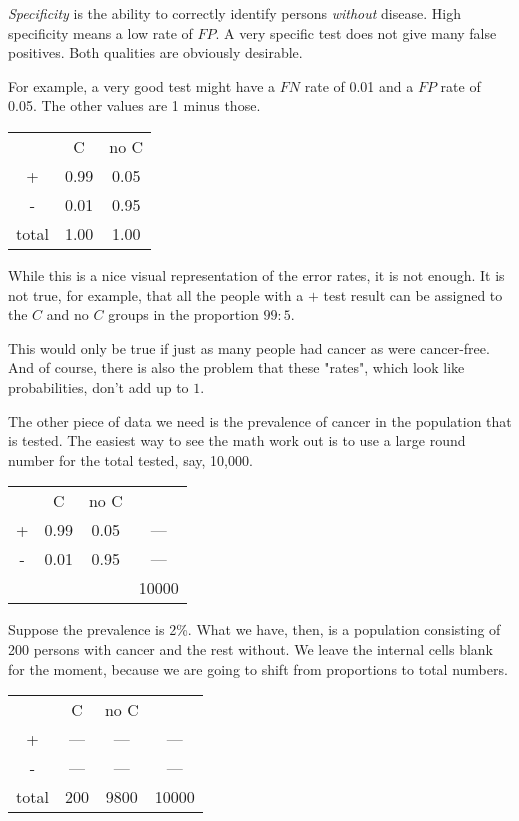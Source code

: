 \documentclass[11pt, oneside]{article}
\begin{document}
\emph{Specificity} is the ability to correctly identify persons \emph{without} disease.  High specificity means a low rate of $FP$.  A very specific test does not give many false positives.  Both qualities are obviously desirable.

For example, a very good test might have a $FN$ rate of 0.01 and a $FP$ rate of 0.05.  The other values are 1 minus those.
\begin{center}
\begin{tabular}{ |c|c|c| } 
 \hline
   & C & no C \\ 
 + & 0.99 & 0.05  \\ 
 - & 0.01 & 0.95  \\  
  total & 1.00 & 1.00  \\ 
 \hline
\end{tabular}
\end{center}

While this is a nice visual representation of the error rates, it is not enough.  It is not true, for example, that all the people with a $+$ test result can be assigned to the $C$ and no $C$ groups in the proportion $99:5$.

This would only be true if just as many people had cancer as were cancer-free.  And of course, there is also the problem that these "rates", which look like probabilities, don't add up to $1$.

The other piece of data we need is the prevalence of cancer in the population that is tested.  The easiest way to see the math work out is to use a large round number for the total tested, say, 10,000.
\begin{center}
\begin{tabular}{ |c|c|c|c| } 
 \hline
   & C & no C &  \\ 
 + & 0.99 & 0.05 & --- \\ 
 - & 0.01 & 0.95 & --- \\ 
 &  &  & 10000 \\ 
 \hline
\end{tabular}
\end{center}
Suppose the prevalence is 2\%.  What we have, then, is a population consisting of 200 persons with cancer and the rest without.  We leave the internal cells blank for the moment, because we are going to shift from proportions to total numbers.
\begin{center}
\begin{tabular}{ |c|c|c|c| } 
 \hline
   & C & no C &  \\ 
 + & --- & --- & --- \\ 
 - & --- & --- & --- \\ 
 total & 200 & 9800 & 10000 \\ 
 \hline
\end{tabular}
\end{center}
\end{document}
